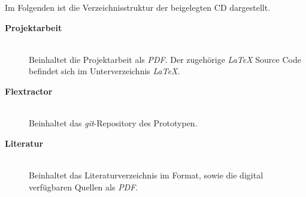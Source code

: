 \label{cha:Beigaben}

Im Folgenden ist die Verzeichnisstruktur der beigelegten CD dargestellt.
 
\begin{description}
    \item[\normalfont \bf Projektarbeit] \hfill \\
        Beinhaltet die Projektarbeit als {\slshape PDF}.
        Der zugehörige \emph{\LaTeX{}} Source Code befindet sich im Unterverzeichnis {\slshape LaTeX}.
    \item[\normalfont \bf Flextractor] \hfill \\
        Beinhaltet das {\slshape git}-Repository des Prototypen.
    \item[\normalfont \bf Literatur] \hfill \\
        Beinhaltet das Literaturverzeichnis im {\slshape \BibTeX{}} Format, sowie die digital verfügbaren Quellen als {\slshape PDF}.
\end{description}
